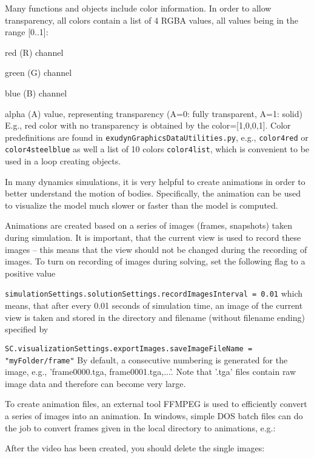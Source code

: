 Many functions and objects include color information. In order to allow transparency, all colors contain a list of 4 RGBA values, all values being in the range [0..1]:
\bi
  \item red (R) channel 
	\item green (G) channel  
	\item blue (B) channel 
	\item alpha (A) value, representing transparency (A=0: fully transparent, A=1: solid)
\ei
E.g., red color with no transparency is obtained by the color=[1,0,0,1]. Color predefinitions are found in \texttt{exudynGraphicsDataUtilities.py}, e.g., \texttt{color4red} or \texttt{color4steelblue} as well a list of 10 colors \texttt{color4list}, which is convenient to be used in a loop creating objects.

%
In many dynamics simulations, it is very helpful to create animations in order to better understand the motion of bodies. Specifically, the animation can be used to visualize the model much slower or faster than the model is computed.

Animations are created based on a series of images (frames, snapshots) taken during simulation. It is important, that the current view is used to record these images -- this means that the view should not be changed during the recording of images.
To turn on recording of images during solving, set the following flag to a positive value
\bi
  \item \texttt{simulationSettings.solutionSettings.recordImagesInterval = 0.01}
\ei
which means, that after every 0.01 seconds of simulation time, an image of the current view is taken and stored in the directory and filename (without filename ending) specified by 
\bi
  \item \texttt{SC.visualizationSettings.exportImages.saveImageFileName = "myFolder/frame"}
\ei
By default, a consecutive numbering is generated for the image, e.g., 'frame0000.tga, frame0001.tga,...'. Note that '.tga' files contain raw image data and therefore can become very large.

To create animation files, an external tool FFMPEG is used to efficiently convert a series of images into an animation.
In windows, simple DOS batch files can do the job to convert frames given in the local directory to animations, e.g.:
\plainlststyle

After the video has been created, you should delete the single images:
\plainlststyle



